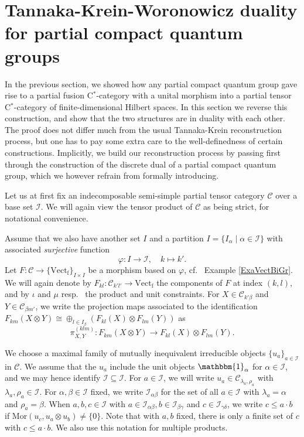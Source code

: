 \documentclass[10pt]{article}
\DeclareMathOperator{\fin}{\mathrm{f}}
\newcommand{\CatC}{\mathcal{C}}
\newcommand{\CatCC}{\mathscr{C}}
\newcommand{\Mor}{\mathrm{Mor}}
\newcommand{\Vect}{\mathrm{Vect}}
\newcommand{\Unitb}{\mathbbm{1}}
\theoremstyle{definition}
\numberwithin{equation}{section}
\begin{document}
\section{Tannaka-Krein-Woronowicz duality for partial compact quantum groups}


In the previous section, we showed how any partial compact quantum group gave rise to a partial fusion C$^*$-category with a unital morphism into a partial tensor C$^*$-category of finite-dimensional Hilbert spaces. In this section we reverse this construction, and show that the two structures are in duality with each other. The proof does not differ much from the usual Tannaka-Krein reconstruction process, but one has to pay some extra care to the well-definedness of certain constructions. Implicitly, we build our reconstruction process by passing first through the construction of the discrete dual of a partial compact quantum group, which we however refrain from formally introducing.

Let us at first fix an indecomposable semi-simple partial tensor category $\CatCC$ over a base set $\mathscr{I}$. We will again view the tensor product of $\CatC$ as being strict, for notational convenience. 

Assume that we also have another set $I$ and a partition $I = \{I_\alpha\mid \alpha\in \mathscr{I}\}$ with associated \emph{surjective} function \[\varphi:I\rightarrow \mathscr{I}, \quad k\mapsto k'.\] Let $F: \CatCC\rightarrow \{\Vect_{\fin}\}_{I\times I}$ be a morphism based on $\varphi$, cf.~ Example \ref{ExaVectBiGr}.  We will again denote by $F_{kl}:\CatCC_{k'l'}\rightarrow \Vect_{\fin}$ the components of $F$ at index $(k,l)$, and by $\iota$ and $\mu$ resp.~ the product and unit constraints.  For $X\in \CatC_{k'\beta}$ and $Y\in \CatC_{\beta m'}$, we write the projection maps associated to the identification $F_{km}(X\otimes Y)\cong \oplus_{l\in I_\beta} \left(F_{kl}(X)\otimes F_{lm}(Y)\right)$ as \[\pi^{(klm)}_{X,Y}:F_{km}(X\otimes Y) \rightarrow F_{kl}(X)\otimes F_{lm}(Y).\]

We choose a maximal family of mutually inequivalent irreducible objects $\{u_a\}_{a\in \mathcal{I}}$ in $\CatC$. We assume that the $u_a$ include the unit objects $\Unitb_{\alpha}$ for $\alpha\in \mathscr{I}$, and we may hence identify $\mathscr{I}\subseteq \mathcal{I}$. For $a\in \mathcal{I}$, we will write $u_a \in \CatC_{\lambda_a,\rho_a}$ with $\lambda_a,\rho_a\in \mathscr{I}$. For $\alpha,\beta\in \mathscr{I}$ fixed, we write $\mathcal{I}_{\alpha\beta}$ for the set of all $a\in \mathcal{I}$ with $\lambda_a=\alpha$ and $\rho_a=\beta$. When $a,b,c\in \mathcal{I}$ with $a\in \mathcal{I}_{\alpha\beta},b\in \mathcal{I}_{\beta\gamma}$ and $c\in \mathcal{I}_{\gamma\delta}$, we write $c\leq a\cdot b$ if $\Mor(u_c,u_a\otimes u_b)\neq \{0\}$. Note that with $a,b$ fixed, there is only a finite set of $c$ with $c\leq a\cdot b$. We also use this notation for multiple products.
\end{document}
